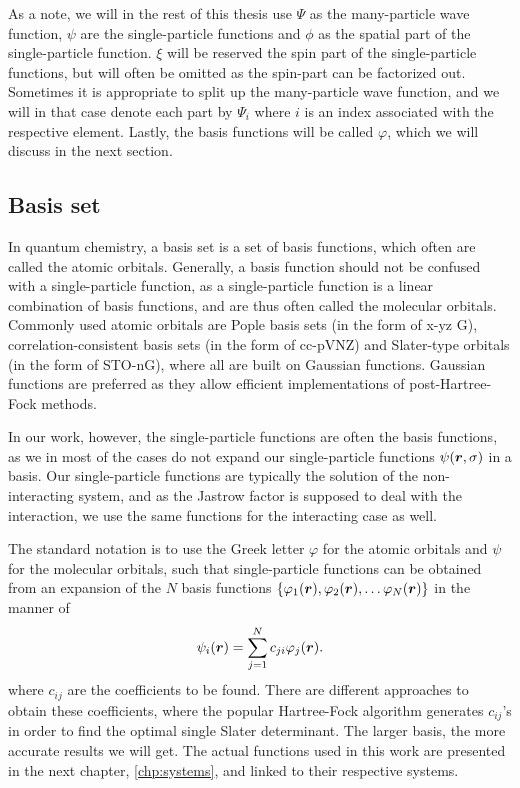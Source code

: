 As a note, we will in the rest of this thesis use $\Psi$ as the many-particle wave function, $\psi$ are the single-particle functions and $\phi$ as the spatial part of the single-particle function. $\xi$ will be reserved the spin part of the single-particle functions, but will often be omitted as the spin-part can be factorized out. Sometimes it is appropriate to split up the many-particle wave function, and we will in that case denote each part by $\Psi_i$ where $i$ is an index associated with the respective element. Lastly, the basis functions will be called $\varphi$, which we will discuss in the next section. 

\subsection{Basis set} \label{sec:basisset}
In quantum chemistry, a basis set is a set of basis functions, which often are called the atomic orbitals.  Generally, a basis function should not be confused with a single-particle function, as a single-particle function is a linear combination of basis functions, and are thus often called the molecular orbitals. Commonly used atomic orbitals are Pople basis sets (in the form of x-yz G), correlation-consistent basis sets (in the form of cc-pVNZ) and Slater-type orbitals (in the form of STO-nG), where all are built on Gaussian functions. Gaussian functions are preferred as they allow efficient implementations of post-Hartree-Fock methods.

In our work, however, the single-particle functions are often the basis functions, as we in most of the cases do not expand our single-particle functions $\psi(\boldsymbol{{r}},\sigma)$ in a basis. Our single-particle functions are typically the solution of the non-interacting system, and as the Jastrow factor is supposed to deal with the interaction, we use the same functions for the interacting case as well.

The standard notation is to use the Greek letter $\varphi$ for the atomic orbitals and $\psi$ for the molecular orbitals, such that single-particle functions can be obtained from an expansion of the $N$ basis functions $\{\varphi_1(\boldsymbol{{r}}),\varphi_2(\boldsymbol{{r}}),\hdots\varphi_N(\boldsymbol{{r}})\}$ in the manner of
\begin{equation}
\psi_i(\boldsymbol{{r}})=\sum_{j=1}^Nc_{ji}\varphi_j(\boldsymbol{{r}}).
\end{equation}
where $c_{ij}$ are the coefficients to be found. There are different approaches to obtain these coefficients, where the popular Hartree-Fock algorithm generates $c_{ij}$'s in order to find the optimal single Slater determinant. The larger basis, the more accurate results we will get. The actual functions used in this work are presented in the next chapter, \ref{chp:systems}, and linked to their respective systems. 

